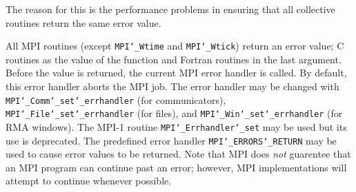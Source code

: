\par
The reason for this is the performance problems in ensuring that
all collective routines return the same error value.
\par
{}
\par
All MPI routines (except {\tt MPI{\tt \char`\_}Wtime} and {\tt MPI{\tt \char`\_}Wtick}) return an error value;
C routines as the value of the function and Fortran routines in the last
argument.  Before the value is returned, the current MPI error handler is
called.  By default, this error handler aborts the MPI job.  The error handler
may be changed with {\tt MPI{\tt \char`\_}Comm{\tt \char`\_}set{\tt \char`\_}errhandler} (for communicators),
{\tt MPI{\tt \char`\_}File{\tt \char`\_}set{\tt \char`\_}errhandler} (for files), and {\tt MPI{\tt \char`\_}Win{\tt \char`\_}set{\tt \char`\_}errhandler} (for
RMA windows).  The MPI-1 routine {\tt MPI{\tt \char`\_}Errhandler{\tt \char`\_}set} may be used but
its use is deprecated.  The predefined error handler
{\tt MPI{\tt \char`\_}ERRORS{\tt \char`\_}RETURN} may be used to cause error values to be returned.
Note that MPI does {\em not} guarentee that an MPI program can continue past
an error; however, MPI implementations will attempt to continue whenever
possible.
\par
{}
\endmanpage
